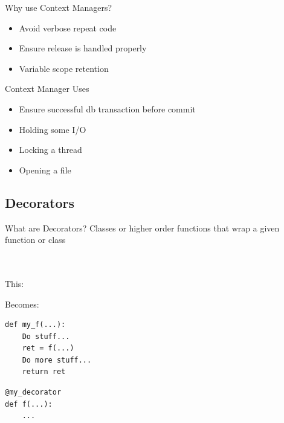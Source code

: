 \documentclass[11pt]{beamer}
\newcommand{\emptyline}{$ $\\}
\begin{document}
\begin{frame}[fragile]{Why use Context Managers?}
    \begin{itemize}
        \item Avoid verbose repeat code
        \item Ensure release is handled properly
        \item Variable scope retention
    \end{itemize}
\end{frame}

\begin{frame}[fragile]{Context Manager Uses}
    \begin{itemize}
        \item Ensure successful db transaction before commit
        \item Holding some I/O
        \item Locking a thread
        \item Opening a file
    \end{itemize}
\end{frame}

\subsection{Decorators}
\begin{frame}[fragile]{What are Decorators?}
    Classes or higher order functions that wrap a given function or class \\
    \emptyline
    \emptyline

    \begin{minipage}{0.45\linewidth}
        This:
    \end{minipage}
    \begin{minipage}{0.45\linewidth}
        Becomes:
    \end{minipage}

    \begin{minipage}{0.45\linewidth}
        \begin{lstlisting}
def my_f(...):
    Do stuff...
    ret = f(...)
    Do more stuff...
    return ret
        \end{lstlisting}
    \end{minipage}
    \pause
    \begin{minipage}{0.45\linewidth}
        \begin{lstlisting}
@my_decorator
def f(...):
    ...
        \end{lstlisting}
    \end{minipage}
\end{frame}
\end{document}
